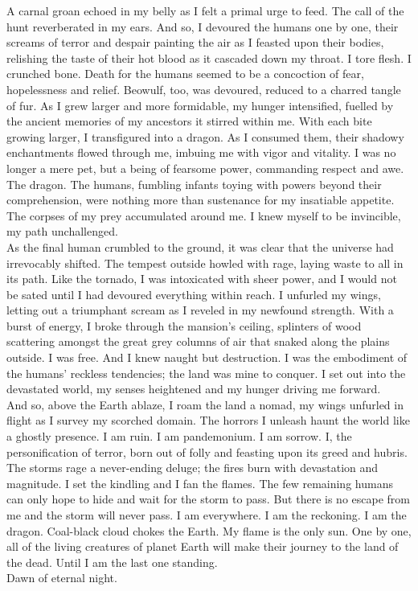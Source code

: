 A carnal groan echoed in my belly as I felt a primal urge to feed. The call of the hunt reverberated in my ears. And so, I devoured the humans one by one, their screams of terror and despair painting the air as I feasted upon their bodies, relishing the taste of their hot blood as it cascaded down my throat. I tore flesh. I crunched bone. Death for the humans seemed to be a concoction of fear, hopelessness and relief. Beowulf, too, was devoured, reduced to a charred tangle of fur. As I grew larger and more formidable, my hunger intensified, fuelled by the ancient memories of my ancestors it stirred within me. With each bite growing larger, I transfigured into a dragon. As I consumed them, their shadowy enchantments flowed through me, imbuing me with vigor and vitality. I was no longer a mere pet, but a being of fearsome power, commanding respect and awe. The dragon. The humans, fumbling infants toying with powers beyond their comprehension, were nothing more than sustenance for my insatiable appetite. The corpses of my prey accumulated around me. I knew myself to be invincible, my path unchallenged. \\

As the final human crumbled to the ground, it was clear that the universe had irrevocably shifted. The tempest outside howled with rage, laying waste to all in its path. Like the tornado, I was intoxicated with sheer power, and I would not be sated until I had devoured everything within reach. I unfurled my wings, letting out a triumphant scream as I reveled in my newfound strength. With a burst of energy, I broke through the mansion's ceiling, splinters of wood scattering amongst the great grey columns of air that snaked along the plains outside. I was free. And I knew naught but destruction. I was the embodiment of the humans' reckless tendencies; the land was mine to conquer. I set out into the devastated world, my senses heightened and my hunger driving me forward. \\

And so, above the Earth ablaze, I roam the land a nomad, my wings unfurled in flight as I survey my scorched domain. The horrors I unleash haunt the world like a ghostly presence. I am ruin. I am pandemonium. I am sorrow. I, the personification of terror, born out of  folly and feasting upon its greed and hubris. The storms rage a never-ending deluge; the fires burn with devastation and magnitude. I set the kindling and I fan the flames. The few remaining humans can only hope to hide and wait for the storm to pass. But there is no escape from me and the storm will never pass. I am everywhere. I am the reckoning. I am the dragon. Coal-black cloud chokes the Earth. My flame is the only sun. One by one, all of the living creatures of planet Earth will make their journey to the land of the dead. Until I am the last one standing. \\

Dawn of eternal night. \\

